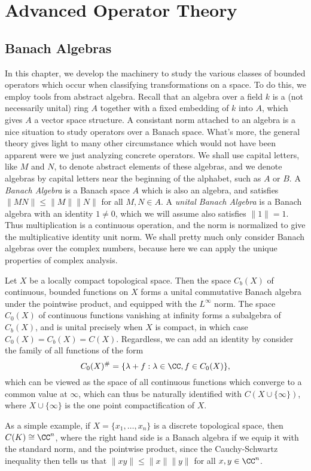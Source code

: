 \part{Advanced Operator Theory}





\chapter{Banach Algebras}

In this chapter, we develop the machinery to study the various classes of bounded operators which occur when classifying transformations on a space. To do this, we employ tools from abstract algebra. Recall that an algebra over a field $k$ is a (not necessarily unital) ring $A$ together with a fixed embedding of $k$ into $A$, which gives $A$ a vector space structure. A consistant norm attached to an algebra is a nice situation to study operators over a Banach space. What's more, the general theory gives light to many other circumstance  which would not have been apparent were we just analyzing concrete operators. We shall use capital letters, like $M$ and $N$, to denote abstract elements of these algebras, and we denote algebras by capital letters near the beginning of the alphabet, such as $A$ or $B$. A \emph{Banach Algebra} is a Banach space $A$ which is also an algebra, and satisfies $\| MN \| \leq \| M \| \| N \|$ for all $M,N \in A$. A \emph{unital Banach Algebra} is a Banach algebra with an identity $1 \neq 0$, which we will assume also satisfies $\| 1 \| = 1$. Thus multiplication is a continuous operation, and the norm is normalized to give the multiplicative identity unit norm. We shall pretty much only consider Banach algebras over the complex numbers, because here we can apply the unique properties of complex analysis.

\begin{example}
    Let $X$ be a locally compact topological space. Then the space $C_b(X)$ of continuous, bounded functions on $X$ forms a unital commutative Banach algebra under the pointwise product, and equipped with the $L^\infty$ norm. The space $C_0(X)$ of continuous functions vanishing at infinity forms a subalgebra of $C_b(X)$, and is unital precisely when $X$ is compact, in which case $C_0(X) = C_b(X) = C(X)$. Regardless, we can add an identity by consider the family of all functions of the form
    \[ C_0(X)^\# = \{ \lambda + f : \lambda \in \CC, f \in C_0(X) \}, \]
    which can be viewed as the space of all continuous functions which converge to a common value at $\infty$, which can thus be naturally identified with $C(X \cup \{ \infty \})$, where $X \cup \{ \infty \}$ is the one point compactification of $X$.

    As a simple example, if $X = \{ x_1, \dots, x_n \}$ is a discrete topological space, then $C(K) \cong \CC^n$, where the right hand side is a Banach algebra if we equip it with the standard norm, and the pointwise product, since the Cauchy-Schwartz inequality then tells us that $\| xy \| \leq \| x \| \| y \|$ for all $x,y \in \CC^n$.
\end{example}

